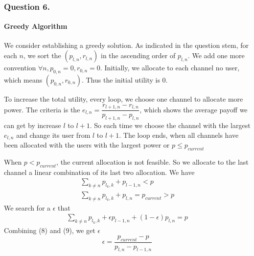 \documentclass[11pt, oneside]{report}
\begin{document}
\newpage

\subsubsection{Question 6.}
\paragraph{Greedy Algorithm}
We consider establishing a greedy solution. As indicated in the question stem, for each $n$, we sort the $(p_{l,n}, r_{l,n})$ in the ascending order of $p_{l,n}$. We add one more convention $\forall n, p_{0,n} = 0, r_{0,n} = 0 $. Initially, we allocate to each channel no user, which means $(p_{0,n}, r_{0,n})$. Thus the initial utility is 0.

To increase the total utility, every loop, we choose one channel to allocate more power. The criteria is the $e_{l,n} = \dfrac{r_{l+1,n} - r_{l,n}}{p_{l+1,n} - p_{l,n}}$, which shows the average payoff we can get by increase $l$ to $l+1$. So each time we choose the channel with the largest $e_{l,n}$ and change its user from $l$ to $l+1$. The loop ends, when all channels have been allocated with the users with the largest power or $p \leq p_{current}$

When $p < p_{current}$, the current allocation is not feasible. So we allocate to the last channel a linear combination of its last two allocation. We have
\begin{align}
\sum_{k \ne n} p_{l_k,k} + p_{l-1,n} < p \\
\sum_{k \ne n} p_{l_k,k} + p_{l,n} = p_{current} > p
\end{align}
We search for a $\epsilon$ that
\begin{align}
\sum_{k \ne n} p_{l_k,k} + \epsilon p_{l-1,n} + (1-\epsilon) p_{l,n} = p
\end{align}
Combining (8) and (9), we get $\epsilon$
$$ \epsilon = \dfrac{p_{current} - p}{p_{l,n} - p_{l-1,n}}$$
\end{document}
